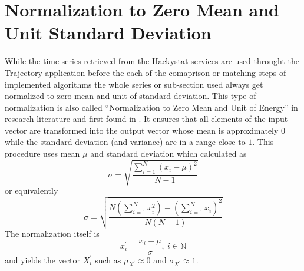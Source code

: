 \section{Normalization to Zero Mean and Unit Standard Deviation} \label{sect:normalization}
While the time-series retrieved from the Hackystat services are used throught the Trajectory application before the each of the comaprison or matching steps of implemented algorithms the whole series or sub-section used always get normalized to zero mean and unit of standard deviation. This type of normalization is also called ``Normalization to Zero Mean and Unit of Energy'' in research literature and first found in \cite{citeulike:3815880}. It ensures that all elements of the input vector are transformed into the output vector whose mean is approximately $0$ while the standard deviation (and variance) are in a range close to $1$.
This procedure uses mean $\mu$ and standard deviation which calculated as 
\begin{equation}
\sigma = \sqrt{ \frac{ \sum_{i=1}^{N} (x_{i} - \mu)^{2} }{ N - 1 } }
\end{equation}
or equivalently
\begin{equation}
\sigma = \sqrt{
	 \frac{
       N \left( \sum_{i=1}^{N} x_{i}^{2}  \right) - 
       \left( \sum_{i=1}^{N} x_{i} \right) ^{2}}
       {N(N-1)}}
\end{equation}
The normalization itself is 
\begin{equation}
x_{i}^{'} = \frac{x_{i} - \mu}{\sigma}, \: i \in \mathbb{N}
\end{equation}
and yields the vector $X_{i}^{'}$ such as $\mu_{X^{'}} \approx 0$ and $\sigma_{X^{'}} \approx 1$.
